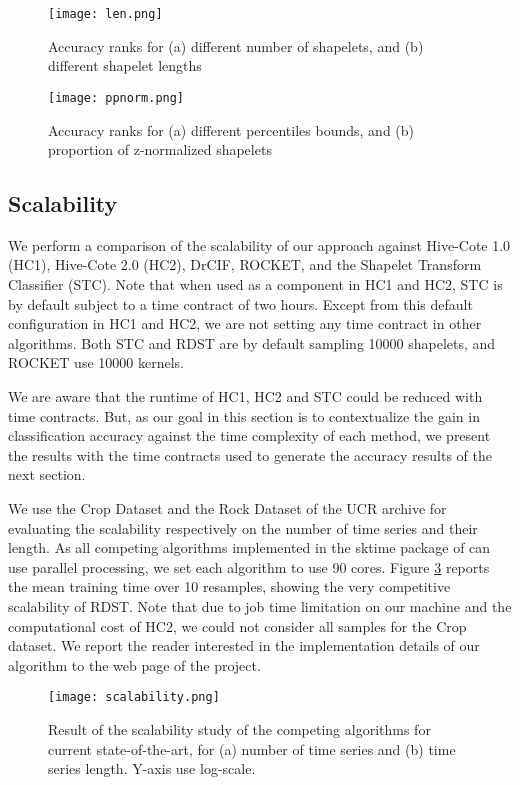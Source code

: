 \begin{figure}[h]
  \texttt{[image: len.png]}
  \centering
  \caption{Accuracy ranks for (a) different number of shapelets, and (b) different shapelet lengths}
  \label{fig:sensi_len_nshp}
\end{figure}

\begin{figure}[h]
  \texttt{[image: ppnorm.png]}
  \centering
  \caption{Accuracy ranks for (a) different percentiles bounds, and (b) proportion of z-normalized shapelets}
  \label{fig:sensi_bound_pnorm}
\end{figure}

\subsection{Scalability}
We perform a comparison of the scalability of our approach against Hive-Cote 1.0 (HC1), Hive-Cote 2.0 (HC2), DrCIF, ROCKET, and the Shapelet Transform Classifier (STC). Note that when used as a component in HC1 and HC2, STC is by default subject to a time contract of two hours. Except from this default configuration in HC1 and HC2, we are not setting any time contract in other algorithms. Both STC and RDST are by default sampling 10000 shapelets, and ROCKET use 10000 kernels.

We are aware that the runtime of HC1, HC2 and STC could be reduced with time contracts. But, as our goal in this section is to contextualize the gain in classification accuracy against the time complexity of each method, we present the results with the time contracts used to generate the accuracy results of the next section.

We use the Crop Dataset and the Rock Dataset of the UCR archive for evaluating the scalability respectively on the number of time series and their length. As all competing algorithms implemented in the sktime package of \cite{sktime} can use parallel processing, we set each algorithm to use 90 cores. Figure \ref{fig:scal} reports the mean training time over 10 resamples, showing the very competitive scalability of RDST. Note that due to job time limitation on our machine and the computational cost of HC2, we could not consider all samples for the Crop dataset. We report the reader interested in the implementation details of our algorithm to the web page of the project.

\begin{figure}[h]
  \texttt{[image: scalability.png]}
  \centering
  \caption{Result of the scalability study of the competing algorithms for current state-of-the-art, for (a) number of time series and (b) time series length. Y-axis use log-scale.}
  \label{fig:scal}
\end{figure}

